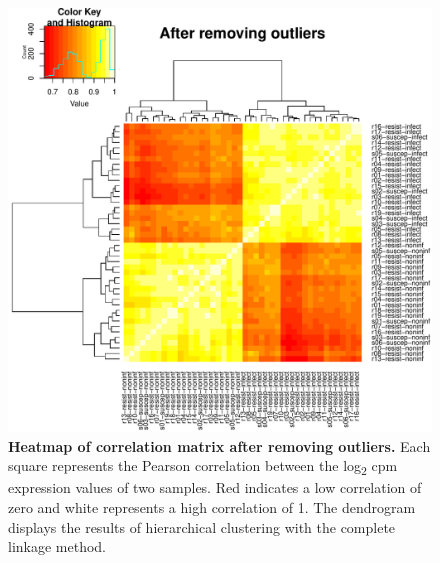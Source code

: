 \begin{figure}[!htb]
\centering
\includegraphics[width=5in]{img/ch03/heatmap-no-outliers.pdf}
\caption[Heatmap of correlation matrix after removing outliers.]{
  \textbf{Heatmap of correlation matrix after removing outliers.} Each
  square represents the Pearson correlation between the
  log\textsubscript{2} cpm expression values of two samples. Red
  indicates a low correlation of zero and white represents a high
  correlation of 1. The dendrogram displays the results of
  hierarchical clustering with the complete linkage method.  }
\label{fig:heat-filt}
\end{figure}


